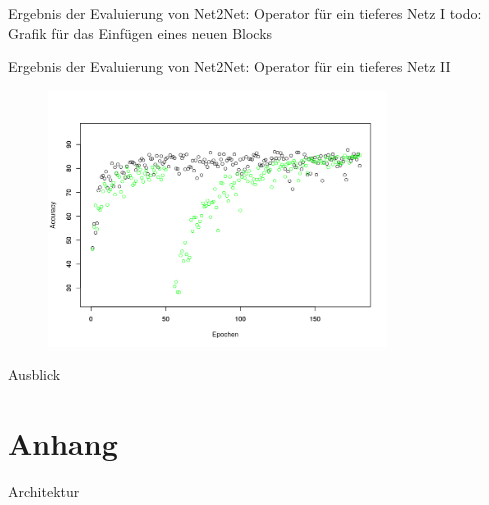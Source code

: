 \documentclass[10pt]{beamer}
\begin{document}
\begin{frame}{Ergebnis der Evaluierung von Net2Net: Operator für ein tieferes Netz I}
 todo: Grafik für das Einfügen eines neuen Blocks
\end{frame}

\begin{frame}{Ergebnis der Evaluierung von Net2Net: Operator für ein tieferes Netz II}
\begin{figure}[h]
 \centering
 \includegraphics[width= 0.8\textwidth]{images/deeper14.png}
\end{figure}



\end{frame}


\begin{frame}{Ausblick}

\end{frame}


\section{Anhang}

\begin{frame}{Architektur}
\end{frame}
\end{document}

